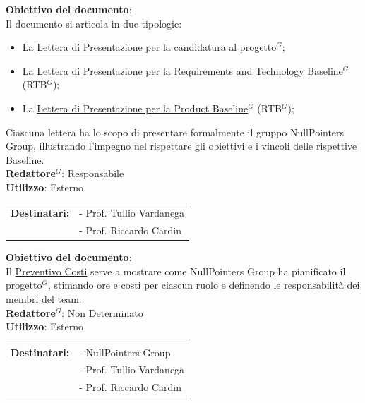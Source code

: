     \textbf{Obiettivo del documento}:\\
	Il documento si articola in due tipologie:
    \begin{itemize}[itemsep=3pt, parsep=1pt, label=$\scriptstyle\bullet$]
		\item La \href{https://nullpointersgroup.github.io/Documentazione/output/Candidatura/Lettera_di_Presentazione.pdf}{Lettera di Presentazione} per la candidatura al progetto$^G$;
		\item La \href{https://nullpointersgroup.github.io/Documentazione/output/RTB/Lettera_di_Presentazione_RTB.pdf}{Lettera di Presentazione per la Requirements and Technology Baseline$^G$} (RTB$^G$);
		\item La \href{https://nullpointersgroup.github.io/Documentazione/output/PB/Lettera_di_Presentazione_PB.pdf}{Lettera di Presentazione per la Product Baseline$^G$} (RTB$^G$);
	\end{itemize}
	Ciascuna lettera ha lo scopo di presentare formalmente il gruppo NullPointers Group, illustrando l’impegno nel rispettare gli obiettivi e i vincoli delle rispettive Baseline.\\[0.5em]
	\medskip
	\textbf{Redattore$^G$}: Responsabile\\
	\medskip
	\textbf{Utilizzo}: Esterno\\
	\medskip 
	\begin{tabular}{@{}l l}
		\textbf{Destinatari:} & - Prof. Tullio Vardanega\\
							  & - Prof. Riccardo Cardin
	\end{tabular}

	\textbf{Obiettivo del documento}:\\
	Il \href{https://nullpointersgroup.github.io/Documentazione/output/Candidatura/Preventivo_Costi.pdf}{Preventivo Costi} serve a mostrare come NullPointers Group ha pianificato il progetto$^G$, stimando ore e costi per ciascun ruolo e definendo le responsabilità dei membri del team.\\[0.5em]
	\medskip
	\textbf{Redattore$^G$}: Non Determinato\\
	\medskip
	\textbf{Utilizzo}: Esterno\\
	\medskip 
	\begin{tabular}{@{}l l}
		\textbf{Destinatari:} & - NullPointers Group\\
		                      & - Prof. Tullio Vardanega\\
							  & - Prof. Riccardo Cardin
	\end{tabular}

